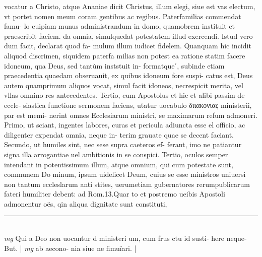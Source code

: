 \documentclass{article}
\begin{document}
\begin{pages}
vocatur a Christo, atque  Ananiae dicit Christus, illum elegi, siue est vas electum, vt portet nomen meum coram gentibus ac regibus. Paterfamilias commendat famu- lo cuipiam munus administrandum in domo, quamobrem instituit et praescribit faciem. da omnia, simulquedat potestatem illud exercendi. Istud vero dum facit, declarat quod fa- mulum illum iudicet fidelem. Quanquam hic incidit aliquod discrimen, siquidem paterfa milias non potest ea ratione statim facere idoneum, qua Deus, sed tantùm inststuit in- formatque ́, subinde etiam praecedentia quaedam obseruauit, ex quibus idoneum fore suspi- catus est, Deus autem quamprimum aliquos vocat, simul facit idoneos, necrespicit merita, vel vllas omnino res antecedentes. Tertio, cum Apostolus et hic et alibi passim de eccle- siastica functione sermonem faciens, utatur uocabulo διιακονιας ministerii, par est memi- nerint omnes Ecclesiarum ministri, se maximarum refum admoneri. Primo, ut sciant, ingentes labores, curas et pericula adiuncta esse el officio, ac diligenter expendat omnia, neque  in- terim grauate quae se decent faciant. Secundo, ut humiles sint, nec sese supra caeteros ef- ferant, imo ne patiantur signa illa arrogantiae uel ambitionis in se conspici. Tertio, oculos semper intendant in potentissimum illum, atque  omnium, qui cum potestate sunt, communem Do minum, ipsum uidelicet Deum, cuius se esse ministros uniuersi non tantum eccleslarum anti stites, uerumetiam gubernatores rerumpublicarum fateri humiliter debent: ad Rom.13.Quar to et postremo ueibis Apostoli admonentur oës, qin aliqua dignitate sunt constituti,  \pend
\vspace{0.5cm}\noindent
\vspace{0.2cm}\rule{1cm}{0.2pt}\\ 
\hspace{0.2cm}\textit{mg}
\footnotesize Qui a Deo non uocantur d ministeri um, cum frus ctu id susti- here neque- But. 
\normalsize| 
\hspace{0.2cm}\textit{mg}
\footnotesize ab aecono- nia siue ne fimuïari. 
\normalsize| 

\end{pages}
\end{document}
